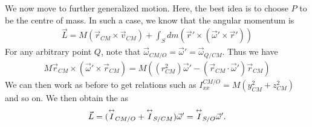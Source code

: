 We now move to further generalized motion. Here, the best idea is to choose $P$ to be the centre of mass. In such a case, we know that the angular momentum is
\begin{align}
    \vec{L} = M(\vec{r}_{CM} \times \vec{v}_{CM}) + \int_{S} dm (\vec{r}' \times (\vec{\omega}' \times \vec{r}'))
\end{align}
For any arbitrary point $Q$, note that $\vec{\omega}_{CM/O} = \vec{\omega}' = \vec{\omega}_{Q/CM}$. Thus we have
\begin{align}
    M \vec{r}_{CM} \times (\vec{\omega}' \times \vec{r}_{CM}) = M\left( (r_{CM}^{2}) \vec{\omega}' - (\vec{r}_{CM} \cdot \vec{\omega}') \vec{r}_{CM} \right)
\end{align}
We can then work as before to get relations such as $I_{xx}^{CM/O} = M(y_{CM}^{2}+z_{CM}^{2})$ and so on. We then obtain the  as
\begin{align}
    \vec{L} = (\overset{\leftrightarrow}{I}_{CM/O} + \overset{\leftrightarrow}{I}_{S/CM}) \vec{\omega}' = \overset{\leftrightarrow}{I}_{S/O} \vec{\omega}'.
\end{align}